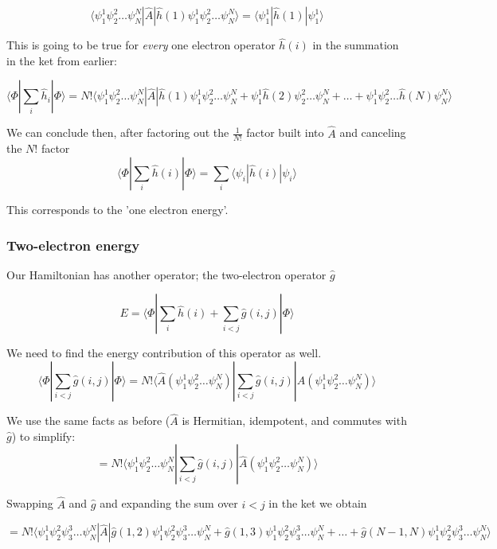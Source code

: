 \documentclass[11pt]{article}
\begin{document}
\[ \langle \psi_1^1 \psi_2^2 \dots \psi_N^N | \hat{A} |  \hat{h}(1)\psi_1^1 \psi_2^2 \dots \psi_N^N \rangle = \langle \psi_1^1 | \hat{h}(1) | \psi_1^1 \rangle \]

This is going to be true for \emph{every} one electron operator
\(\hat{h}(i)\) in the summation in the ket from earlier:

\[ \langle \Phi | \sum\limits_{i} \hat{h}_i | \Phi \rangle  = N! \langle \psi_1^1 \psi_2^2 \dots \psi_N^N | \hat{A} |  \hat{h}(1)\psi_1^1 \psi_2^2 \dots \psi_N^N + \psi_1^1 \hat{h}(2) \psi_2^2 \dots \psi_N^N  + \dots + \psi_1^1  \psi_2^2 \dots \hat{h}(N) \psi_N^N \rangle \]

We can conclude then, after factoring out the \(\frac{1}{N!}\) factor
built into \(\hat{A}\) and canceling the \(N!\) factor
\[ \langle \Phi | \sum\limits_{i} \hat{h}(i) | \Phi \rangle  = \sum\limits_{i} \langle \psi_i | \hat{h}(i) | \psi_i \rangle \]

This corresponds to the 'one electron energy'.

    \subsubsection{Two-electron energy}\label{two-electron-energy}

Our Hamiltonian has another operator; the two-electron operator
\(\hat{g}\)

\[E = \langle \Phi  | \sum\limits_{i} \hat{h}(i) + \sum\limits_{i < j} \hat{g}(i,j) | \Phi \rangle\]

We need to find the energy contribution of this operator as well.
\[ \langle \Phi | \sum\limits_{i < j} \hat{g}(i,j) | \Phi \rangle = N! \langle \hat{A} (\psi_1^1 \psi_2^2 \dots \psi_N^N) |  \sum\limits_{i < j} \hat{g}(i,j) | \hat{A} (\psi_1^1 \psi_2^2 \dots \psi_N^N)  \rangle  \]

We use the same facts as before (\(\hat{A}\) is Hermitian, idempotent,
and commutes with \(\hat{g}\)) to simplify:
\[  = N! \langle \psi_1^1 \psi_2^2 \dots \psi_N^N |  \sum\limits_{i < j} \hat{g}(i,j) | \hat{A} (\psi_1^1 \psi_2^2 \dots \psi_N^N)  \rangle  \]

Swapping \(\hat{A}\) and \(\hat{g}\) and expanding the sum over
\(i < j\) in the ket we obtain

\[= N! \langle \psi_1^1 \psi_2^2 \psi_3^3 \dots \psi_N^N | \hat{A} |  \hat{g}(1,2) \psi_1^1 \psi_2^2 \psi_3^3 \dots \psi_N^N + \hat{g}(1,3) \psi_1^1 \psi_2^2 \psi_3^3 \dots \psi_N^N + \dots + \hat{g}(N-1,N) \psi_1^1 \psi_2^2 \psi_3^3 \dots \psi_N^N  \rangle \]
\end{document}
